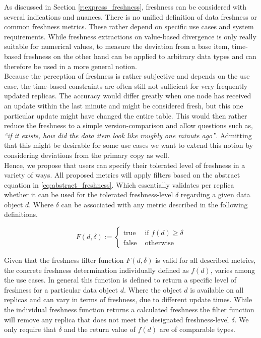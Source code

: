 As discussed in Section \ref{r:express_freshness}, freshness can be considered with several indications and nuances.
There is no unified definition of data freshness or common freshness metrics.
These rather depend on specific use cases and system requirements.
While freshness extractions on value-based divergence is only really suitable for numerical values,
to measure the deviation from a base item, time-based freshness on the other hand can be applied to arbitrary data types and can therefore be used 
in a more general notion.\\
Because the perception of freshness is rather subjective and depends on the use case, the time-based constraints are often still not sufficient for very frequently
updated replicas.
The accuracy would differ greatly when one node has received an update within the last minute and might be considered fresh, but this one particular 
update might have changed the entire table. 
This would then rather reduce the freshness to a simple version-comparison and allow questions such as, \textit{``if it exists, how did the data item look like roughly one minute ago''}.
Admitting that this might be desirable for some use cases we want to extend this notion by considering deviations from the primary copy as well.\\
Hence, we propose that users can specify their tolerated level of freshness in a variety of ways. 
All proposed metrics will apply filters based on the abstract equation in \ref{eq:abstract_freshness}. 
Which essentially validates per replica whether it can be used for the tolerated freshness-level $\delta$ regarding a given data object $d$.
Where $\delta$ can be associated with any metric described in the following definitions.

\begin{equation} \label{eq:abstract_freshness}
    F(d, \delta) :=
        \begin{cases}
            \text{true } & \text{if } f(d) \geq \delta\\
            \text{false } & \text{otherwise }
        \end{cases}
\end{equation}


Given that the freshness filter function $F(d, \delta)$ is valid for all described metrics, the concrete freshness determination individually defined as $f(d)$, 
varies among the use cases.
In general this function is defined to return a specific level of freshness for a particular data object $d$. 
Where the object $d$ is available on all replicas and can vary in terms of freshness, due to different update times.
While the individual freshness function returns a calculated freshness the filter function will remove any replica that does not meet the designated freshness-level $\delta$. 
We only require that $\delta$ and the return value of $f(d)$ are of comparable types.


